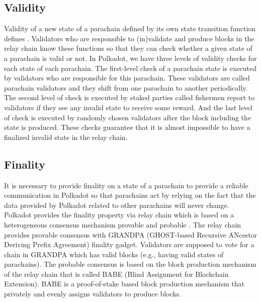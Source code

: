 \subsection{Validity}
 Validity of a new state of a parachain  defined by its own state transition function  defines . Validators who are responsible to (in)validate and produce blocks in the relay chain  know these functions so that they can  check whether a given state of a parachain is valid or not.  In Polkadot, we have three levels of validity checks for each state of each parachain. The first-level check of a parachain state is executed by validators who are responsible for this parachain. These validators are called parachain validators and they shift from one parachain to another  periodically. The second level of check is executed by staked parties called fishermen  report to validators if they see any invalid state to receive some reward. And the last level of check is executed by randomly chosen validators after the block including the state is produced. These checks guarantee that it is almost impossible to have a finalized invalid state in the relay chain.

\subsection{Finality}

 It is necessary to provide finality on a state of a parachain  to provide a reliable communication in Polkadot so that parachains act by relying on the fact that the data provided by Polkadot related to other parachains will never change.  Polkadot provides the finality property via relay chain which is based on a heterogeneous consensus mechanism  provable  and probable . The relay chain provides provable consensus with GRANDPA (GHOST-based Recursive ANcestor Deriving Prefix Agreement)  finality gadget. Validators are supposed to vote for a chain in GRANDPA  which has valid blocks (e.g., having valid states of parachains). The probable consensus is based on the block production mechanism of the relay chain that is called BABE (Blind Assignment for Blockchain Extension). BABE is a proof-of-stake based block production mechanism that privately and evenly assigns validators to produce blocks.


